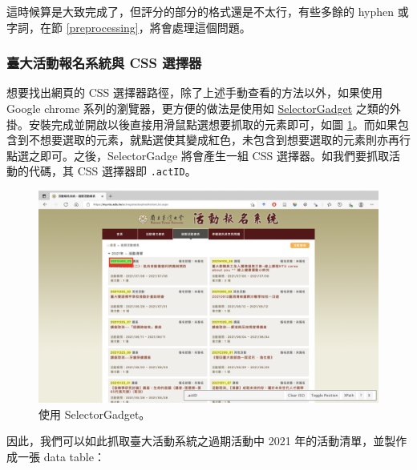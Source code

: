 \documentclass[
]{book}
\theoremstyle{definition}
\theoremstyle{remark}
\begin{document}
這時候算是大致完成了，但評分的部分的格式還是不太行，有些多餘的 hyphen 或字詞，在節 \ref{preprocessing}，將會處理這個問題。

\hypertarget{ux81faux5927ux6d3bux52d5ux5831ux540dux7cfbux7d71ux8207-css-ux9078ux64c7ux5668}{%
\subsubsection{臺大活動報名系統與 CSS 選擇器}\label{ux81faux5927ux6d3bux52d5ux5831ux540dux7cfbux7d71ux8207-css-ux9078ux64c7ux5668}}

想要找出網頁的 CSS 選擇器路徑，除了上述手動查看的方法以外，如果使用 Google chrome 系列的瀏覽器，更方便的做法是使用如 \href{https://chrome.google.com/webstore/detail/selectorgadget/mhjhnkcfbdhnjickkkdbjoemdmbfginb?hl=zh-TW}{SelectorGadget} 之類的外掛。安裝完成並開啟以後直接用滑鼠點選想要抓取的元素即可，如圖 \ref{fig:ntuevents}。而如果包含到不想要選取的元素，就點選使其變成紅色，未包含到想要選取的元素則亦再行點選之即可。之後，SelectorGadge 將會產生一組 CSS 選擇器。如我們要抓取活動的代碼，其 CSS 選擇器即 \texttt{.actID}。

\begin{figure}

{\centering \includegraphics[width=650pt]{images/截圖 2021-07-21 下午5.52.26} 

}

\caption{使用 SelectorGadget。}\label{fig:ntuevents}
\end{figure}

因此，我們可以如此抓取臺大活動系統之過期活動中 2021 年的活動清單，並製作成一張 data table：
\end{document}
